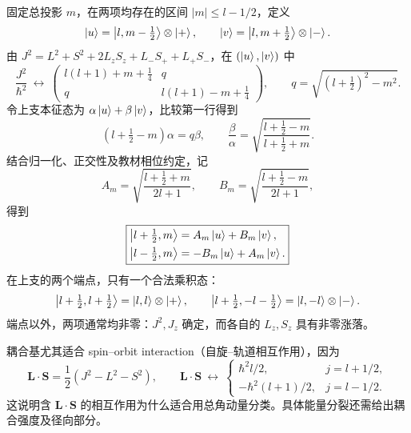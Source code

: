 固定总投影 $m$，在两项均存在的区间 $|m|\le l-1/2$，定义
\begin{equation}
  \left|u\right\rangle=\left|l,m-\tfrac12\right\rangle\otimes\left|+\right\rangle,
  \qquad
  \left|v\right\rangle=\left|l,m+\tfrac12\right\rangle\otimes\left|-\right\rangle.
\end{equation}
由 $J^2=L^2+S^2+2L_zS_z+L_-S_++L_+S_-$，在 $(\left|u\right\rangle,\left|v\right\rangle)$ 中
\begin{equation}
  \frac{J^2}{\hbar^2}\ \longleftrightarrow\
  \begin{pmatrix}
    l(l+1)+m+\tfrac14&q\\
    q&l(l+1)-m+\tfrac14
  \end{pmatrix},\qquad
  q=\sqrt{(l+\tfrac12)^2-m^2}.
\end{equation}
令上支本征态为 $\alpha\left|u\right\rangle+\beta\left|v\right\rangle$，比较第一行得到
\begin{equation}
  (l+\tfrac12-m)\alpha=q\beta,
  \qquad \frac\beta\alpha
    =\sqrt{\frac{l+\tfrac12-m}{l+\tfrac12+m}}.
\end{equation}
结合归一化、正交性及教材相位约定，记
\begin{equation}
  A_m=\sqrt{\frac{l+\tfrac12+m}{2l+1}},\qquad
  B_m=\sqrt{\frac{l+\tfrac12-m}{2l+1}},
\end{equation}
得到
\begin{equation}
  \boxed{\begin{aligned}
    \left|l+\tfrac12,m\right\rangle&=A_m\left|u\right\rangle+B_m\left|v\right\rangle,\\
    \left|l-\tfrac12,m\right\rangle&=-B_m\left|u\right\rangle+A_m\left|v\right\rangle.
  \end{aligned}}
\end{equation}
在上支的两个端点，只有一个合法乘积态：
\begin{equation}
  \left|l+\tfrac12,l+\tfrac12\right\rangle=\left|l,l\right\rangle\otimes\left|+\right\rangle,
  \qquad
  \left|l+\tfrac12,-l-\tfrac12\right\rangle=\left|l,-l\right\rangle\otimes\left|-\right\rangle.
\end{equation}
端点以外，两项通常均非零：$J^2,J_z$ 确定，而各自的 $L_z,S_z$ 具有非零涨落。

耦合基尤其适合 spin--orbit interaction（自旋--轨道相互作用），因为
\begin{equation}
  \mathbf L\cdot\mathbf S=\frac12(J^2-L^2-S^2),\qquad
  \boxed{\mathbf L\cdot\mathbf S\ \longleftrightarrow\
  \begin{cases}
    \hbar^2l/2,&j=l+1/2,\\
    -\hbar^2(l+1)/2,&j=l-1/2.
  \end{cases}}
\end{equation}
这说明含 $\mathbf L\cdot\mathbf S$ 的相互作用为什么适合用总角动量分类。具体能量分裂还需给出耦合强度及径向部分。

